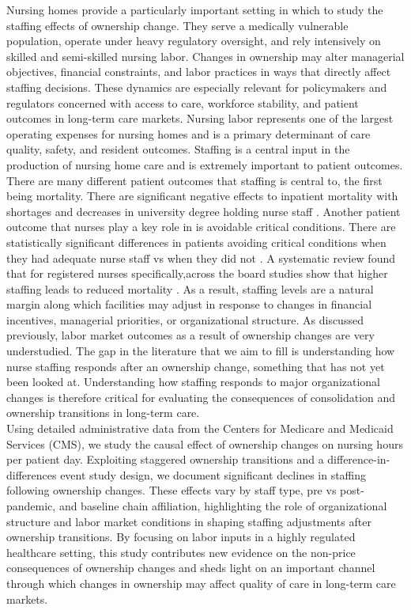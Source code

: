 \documentclass[preprint,authoryear]{elsarticle}
\begin{document}
Nursing homes provide a particularly important setting in which to study the staffing effects of ownership change. They serve a medically vulnerable population, operate under heavy regulatory oversight, and rely intensively on skilled and semi-skilled nursing labor. Changes in ownership may alter managerial objectives, financial constraints, and labor practices in ways that directly affect staffing decisions. These dynamics are especially relevant for policymakers and regulators concerned with access to care, workforce stability, and patient outcomes in long-term care markets. Nursing labor represents one of the largest operating expenses for nursing homes and is a primary determinant of care quality, safety, and resident outcomes. Staffing is a central input in the production of nursing home care and is extremely important to patient outcomes. There are many different patient outcomes that staffing is central to, the first being mortality. There are significant negative effects to inpatient mortality with shortages and decreases in university degree holding nurse staff \citep{kelly_et_al_2026}. Another patient outcome that nurses play a key role in is avoidable critical conditions. There are statistically significant differences in patients avoiding critical conditions when they had adequate nurse staff vs when they did not \citep{udina_et_al_2025}. A systematic review found that for registered nurses specifically,across the board studies show that higher staffing leads to reduced mortality \citep{dallora_et_al_2022}. As a result, staffing levels are a natural margin along which facilities may adjust in response to changes in financial incentives, managerial priorities, or organizational structure. As discussed previously, labor market outcomes as a result of ownership changes are very understudied. The gap in the literature that we aim to fill is understanding how nurse staffing responds after an ownership change, something that has not yet been looked at. Understanding how staffing responds to major organizational changes is therefore critical for evaluating the consequences of consolidation and ownership transitions in long-term care.\\

Using detailed administrative data from the Centers for Medicare and Medicaid Services (CMS), we study the causal effect of ownership changes on nursing hours per patient day. Exploiting staggered ownership transitions and a difference-in-differences event study design, we document significant declines in staffing following ownership changes. These effects vary by staff type, pre vs post-pandemic, and baseline chain affiliation, highlighting the role of organizational structure and labor market conditions in shaping staffing adjustments after ownership transitions. By focusing on labor inputs in a highly regulated healthcare setting, this study contributes new evidence on the non-price consequences of ownership changes and sheds light on an important channel through which changes in ownership may affect quality of care in long-term care markets.\\
\end{document}
